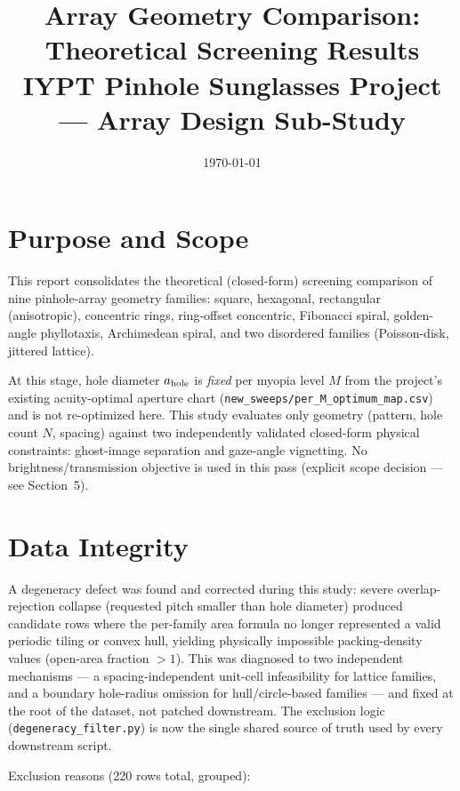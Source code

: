 \documentclass[11pt]{article}
\title{Array Geometry Comparison: Theoretical Screening Results\\
\large IYPT Pinhole Sunglasses Project --- Array Design Sub-Study}
\author{}
\date{\today}
\begin{document}
\maketitle

\section{Purpose and Scope}
This report consolidates the theoretical (closed-form) screening comparison of
nine pinhole-array geometry families: square, hexagonal, rectangular (anisotropic),
concentric rings, ring-offset concentric, Fibonacci spiral, golden-angle
phyllotaxis, Archimedean spiral, and two disordered families (Poisson-disk,
jittered lattice).

At this stage, hole diameter $a_{\rm hole}$ is \emph{fixed} per myopia level $M$
from the project's existing acuity-optimal aperture chart
(\texttt{new\_sweeps/per\_M\_optimum\_map.csv}) and is not re-optimized here. This
study evaluates only geometry (pattern, hole count $N$, spacing) against two
independently validated closed-form physical constraints: ghost-image separation
and gaze-angle vignetting. No brightness/transmission objective is used in this
pass (explicit scope decision --- see Section~5).

\section{Data Integrity}
A degeneracy defect was found and corrected during this study: severe
overlap-rejection collapse (requested pitch smaller than hole diameter) produced
candidate rows where the per-family area formula no longer represented a valid
periodic tiling or convex hull, yielding physically impossible packing-density
values (open-area fraction $>1$). This was diagnosed to two independent
mechanisms --- a spacing-independent unit-cell infeasibility for lattice families,
and a boundary hole-radius omission for hull/circle-based families --- and fixed
at the root of the dataset, not patched downstream. The exclusion logic
(\texttt{degeneracy\_filter.py}) is now the single shared source of truth used
by every downstream script.



\vspace{0.3cm}
\noindent Exclusion reasons (220 rows total, grouped):

\end{document}
